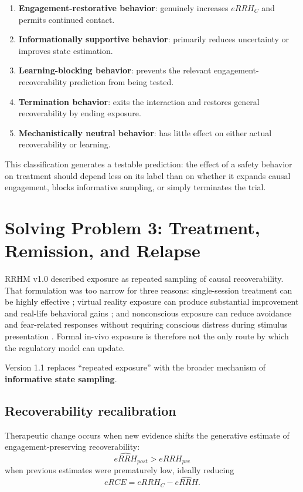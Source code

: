 \documentclass[11pt]{article}
\begin{document}
\begin{enumerate}[leftmargin=*]
\item \textbf{Engagement-restorative behavior}: genuinely increases $eRRH_C$ and permits continued contact.
\item \textbf{Informationally supportive behavior}: primarily reduces uncertainty or improves state estimation.
\item \textbf{Learning-blocking behavior}: prevents the relevant engagement-recoverability prediction from being tested.
\item \textbf{Termination behavior}: exits the interaction and restores general recoverability by ending exposure.
\item \textbf{Mechanistically neutral behavior}: has little effect on either actual recoverability or learning.
\end{enumerate}

This classification generates a testable prediction: the effect of a safety behavior on treatment should depend less on its label than on whether it expands causal engagement, blocks informative sampling, or simply terminates the trial.

\section{Solving Problem 3: Treatment, Remission, and Relapse}

RRHM v1.0 described exposure as repeated sampling of causal recoverability. That formulation was too narrow for three reasons: single-session treatment can be highly effective \cite{odgers2022}; virtual reality exposure can produce substantial improvement and real-life behavioral gains \cite{freitas2021,morina2015}; and nonconscious exposure can reduce avoidance and fear-related responses without requiring conscious distress during stimulus presentation \cite{siegel2025}. Formal in-vivo exposure is therefore not the only route by which the regulatory model can update.

Version 1.1 replaces ``repeated exposure'' with the broader mechanism of \textbf{informative state sampling}.

\subsection{Recoverability recalibration}
Therapeutic change occurs when new evidence shifts the generative estimate of engagement-preserving recoverability:
\[
\widehat{eRRH}_{post}>\widehat{eRRH}_{pre}
\]
when previous estimates were prematurely low, ideally reducing
\[
eRCE=eRRH_C-\widehat{eRRH}.
\]
\end{document}
